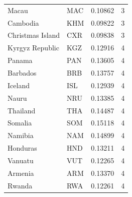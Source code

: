 \begin{table}[htbp]
\begin{tabular}{llcc}
Macau & MAC &  0.10862 & 3 \\
Cambodia & KHM &  0.09822 & 3 \\
Christmas Island & CXR &  0.09838 & 3 \\
Kyrgyz Republic & KGZ &  0.12916 & 4 \\
Panama & PAN &  0.13605 & 4 \\
Barbados & BRB &  0.13757 & 4 \\
Iceland & ISL &  0.12939 & 4 \\
Nauru & NRU &  0.13385 & 4 \\
Thailand & THA &  0.14487 & 4 \\
Somalia & SOM &  0.15118 & 4 \\
Namibia & NAM &  0.14899 & 4 \\
Honduras & HND &  0.13211 & 4 \\
Vanuatu & VUT &  0.12265 & 4 \\
Armenia & ARM &  0.13370 & 4 \\
Rwanda & RWA &  0.12261 & 4 \\
\bottomrule
\end{tabular}
\end{table}
